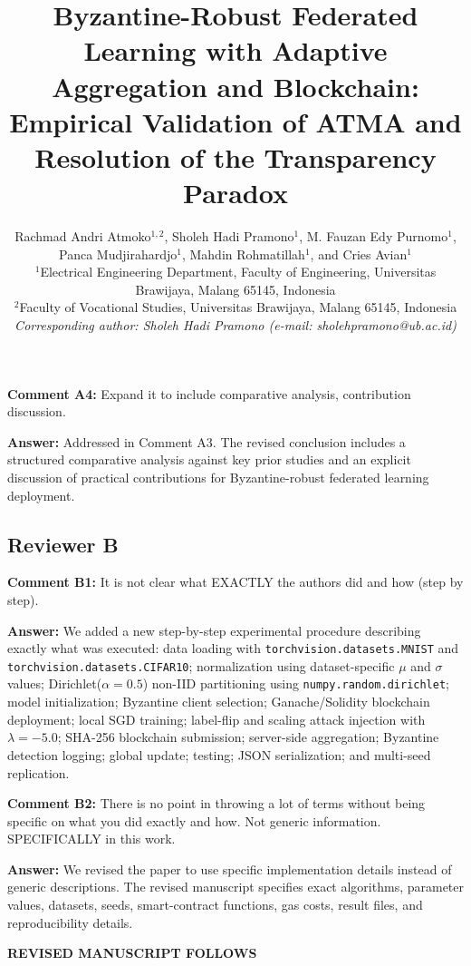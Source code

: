 \documentclass[12pt,a4paper,onecolumn]{article}
\begin{document}
\textbf{Comment A4:} Expand it to include comparative analysis, contribution discussion.

\textbf{Answer:} Addressed in Comment A3. The revised conclusion includes a structured comparative analysis against key prior studies and an explicit discussion of practical contributions for Byzantine-robust federated learning deployment.

\subsection*{Reviewer B}
\textbf{Comment B1:} It is not clear what EXACTLY the authors did and how (step by step).

\textbf{Answer:} We added a new step-by-step experimental procedure describing exactly what was executed: data loading with \texttt{torchvision.datasets.MNIST} and \texttt{torchvision.datasets.CIFAR10}; normalization using dataset-specific $\mu$ and $\sigma$ values; Dirichlet($\alpha=0.5$) non-IID partitioning using \texttt{numpy.random.dirichlet}; model initialization; Byzantine client selection; Ganache/Solidity blockchain deployment; local SGD training; label-flip and scaling attack injection with $\lambda=-5.0$; SHA-256 blockchain submission; server-side aggregation; Byzantine detection logging; global update; testing; JSON serialization; and multi-seed replication.

\textbf{Comment B2:} There is no point in throwing a lot of terms without being specific on what you did exactly and how. Not generic information. SPECIFICALLY in this work.

\textbf{Answer:} We revised the paper to use specific implementation details instead of generic descriptions. The revised manuscript specifies exact algorithms, parameter values, datasets, seeds, smart-contract functions, gas costs, result files, and reproducibility details.

\newpage
\begin{center}\textbf{REVISED MANUSCRIPT FOLLOWS}\end{center}
\newpage

\title{\textbf{Byzantine-Robust Federated Learning with Adaptive Aggregation and Blockchain: Empirical Validation of ATMA and Resolution of the Transparency Paradox}}

\author{
Rachmad Andri Atmoko$^{1,2}$,
Sholeh Hadi Pramono$^{1}$,
M. Fauzan Edy Purnomo$^{1}$,
Panca Mudjirahardjo$^{1}$,
Mahdin Rohmatillah$^{1}$, and
Cries Avian$^{1}$\\[10pt]
$^{1}$Electrical Engineering Department, Faculty of Engineering, Universitas Brawijaya, Malang 65145, Indonesia\\
$^{2}$Faculty of Vocational Studies, Universitas Brawijaya, Malang 65145, Indonesia\\[5pt]
\textit{Corresponding author: Sholeh Hadi Pramono (e-mail: sholehpramono@ub.ac.id)}
}
\end{document}
